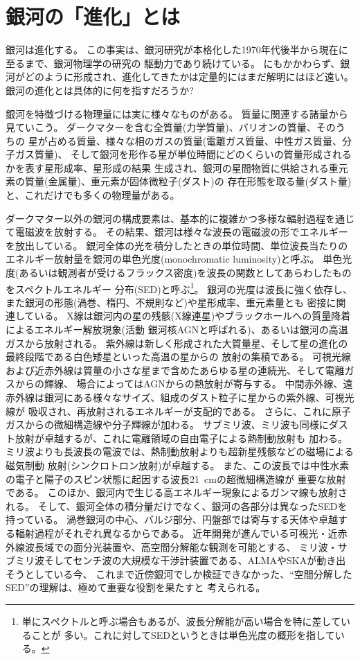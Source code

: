 \section{銀河の「進化」とは}

銀河は進化する。
この事実は、銀河研究が本格化した1970年代後半から現在に至るまで、銀河物理学の研究の
駆動力であり続けている。
にもかかわらず、銀河がどのように形成され、進化してきたかは定量的にはまだ解明にはほど遠い。
銀河の進化とは具体的に何を指すだろうか?

銀河を特徴づける物理量には実に様々なものがある。
質量に関連する諸量から見ていこう。
ダークマターを含む全質量(力学質量)、バリオンの質量、そのうちの
星が占める質量、様々な相のガスの質量(電離ガス質量、中性ガス質量、分子ガス質量)、
そして銀河を形作る星が単位時間にどのくらいの質量形成されるかを表す星形成率、星形成の結果
生成され、銀河の星間物質に供給される重元素の質量(金属量)、重元素が固体微粒子(ダスト)の
存在形態を取る量(ダスト量)と、これだけでも多くの物理量がある。

ダークマター以外の銀河の構成要素は、基本的に複雑かつ多様な輻射過程を通じて電磁波を放射する。
その結果、銀河は様々な波長の電磁波の形でエネルギーを放出している。
銀河全体の光を積分したときの単位時間、単位波長当たりのエネルギー放射量を銀河の単色光度(monochromatic 
luminosity)と呼ぶ。
単色光度(あるいは観測者が受けるフラックス密度)を波長の関数としてあらわしたものをスペクトルエネルギー
分布(SED)と呼ぶ\footnote{単にスペクトルと呼ぶ場合もあるが、波長分解能が高い場合を特に差していることが
多い。これに対してSEDというときは単色光度の概形を指している。}。
銀河の光度は波長に強く依存し、また銀河の形態(渦巻、楕円、不規則など)や星形成率、重元素量とも
密接に関連している。
X線は銀河内の星の残骸(X線連星)やブラックホールへの質量降着によるエネルギー解放現象(活動
銀河核AGNと呼ばれる)、あるいは銀河の高温ガスから放射される。
紫外線は新しく形成された大質量星、そして星の進化の最終段階である白色矮星といった高温の星からの
放射の集積である。
可視光線および近赤外線は質量の小さな星まで含めたあらゆる星の連続光、そして電離ガスからの輝線、
場合によってはAGNからの熱放射が寄与する。
中間赤外線、遠赤外線は銀河にある様々なサイズ、組成のダスト粒子に星からの紫外線、可視光線が
吸収され、再放射されるエネルギーが支配的である。
さらに、これに原子ガスからの微細構造線や分子輝線が加わる。
サブミリ波、ミリ波も同様にダスト放射が卓越するが、これに電離領域の自由電子による熱制動放射も
加わる。
ミリ波よりも長波長の電波では、熱制動放射よりも超新星残骸などの磁場による磁気制動
放射(シンクロトロン放射)が卓越する。
また、この波長では中性水素の電子と陽子のスピン状態に起因する波長21~cmの超微細構造線が
重要な放射である。
このほか、銀河内で生じる高エネルギー現象によるガンマ線も放射される。
そして、銀河全体の積分量だけでなく、銀河の各部分は異なったSEDを持っている。
渦巻銀河の中心、バルジ部分、円盤部では寄与する天体や卓越する輻射過程がそれぞれ異なるからである。
近年開発が進んでいる可視光・近赤外線波長域での面分光装置や、高空間分解能な観測を可能とする、
ミリ波・サブミリ波そしてセンチ波の大規模な干渉計装置である、ALMAやSKAが動き出そうとしている今、
これまで近傍銀河でしか検証できなかった、``空間分解したSED''の理解は、極めて重要な役割を果たすと
考えられる。

